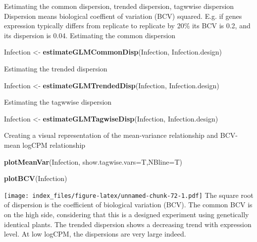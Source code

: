 \documentclass[
]{article}
\newenvironment{Shaded}{\begin{snugshade}}{\end{snugshade}}
\newcommand{\AttributeTok}[1]{\textcolor[rgb]{0.13,0.29,0.53}{#1}}
\newcommand{\FunctionTok}[1]{\textcolor[rgb]{0.13,0.29,0.53}{\textbf{#1}}}
\newcommand{\NormalTok}[1]{#1}
\newcommand{\OtherTok}[1]{\textcolor[rgb]{0.56,0.35,0.01}{#1}}
\begin{document}
Estimating the common dispersion, trended dispersion, tagwwise
dispersion Dispersion means biological coeffient of variation (BCV)
squared. E.g. if genes expression typically differs from replicate to
replicate by 20\% its BCV is 0.2, and its dispersion is 0.04. Estimating
the common dispersion

\begin{Shaded}
\begin{Highlighting}[]
\NormalTok{Infection }\OtherTok{\textless{}{-}} \FunctionTok{estimateGLMCommonDisp}\NormalTok{(Infection, Infection.design)}
\end{Highlighting}
\end{Shaded}

Estimating the trended dispersion

\begin{Shaded}
\begin{Highlighting}[]
\NormalTok{Infection }\OtherTok{\textless{}{-}} \FunctionTok{estimateGLMTrendedDisp}\NormalTok{(Infection, Infection.design)}
\end{Highlighting}
\end{Shaded}

Estimating the tagwwise dispersion

\begin{Shaded}
\begin{Highlighting}[]
\NormalTok{Infection }\OtherTok{\textless{}{-}} \FunctionTok{estimateGLMTagwiseDisp}\NormalTok{(Infection, Infection.design)}
\end{Highlighting}
\end{Shaded}

Creating a visual representation of the mean-variance relationship and
BCV-mean logCPM relationship

\begin{Shaded}
\begin{Highlighting}[]
\FunctionTok{plotMeanVar}\NormalTok{(Infection, }\AttributeTok{show.tagwise.vars=}\NormalTok{T,}\AttributeTok{NBline=}\NormalTok{T)}
\end{Highlighting}
\end{Shaded}

\begin{Shaded}
\begin{Highlighting}[]
\FunctionTok{plotBCV}\NormalTok{(Infection)}
\end{Highlighting}
\end{Shaded}

\texttt{[image: index\_files/figure-latex/unnamed-chunk-72-1.pdf]} The
square root of dispersion is the coefficient of biological variation
(BCV). The common BCV is on the high side, considering that this is a
designed experiment using genetically identical plants. The trended
dispersion shows a decreasing trend with expression level. At low
logCPM, the dispersions are very large indeed.
\end{document}
